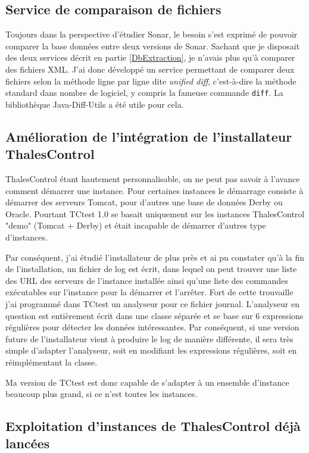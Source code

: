 \subsection{Service de comparaison de fichiers}

Toujours dans la perspective d'étudier Sonar, le besoin s'est exprimé de pouvoir 
comparer la base données entre deux versions de Sonar. Sachant que je disposait
des deux services décrit en partie \ref{DbExtraction}, je n'avais plus qu'à 
comparer des fichiers XML. J'ai donc développé un 
service permettant de comparer deux fichiers selon la méthode ligne par ligne 
dite \textit{unified diff}, c'est-à-dire la méthode standard dans nombre de 
logiciel, y compris la fameuse commande \verb|diff|. La bibliothèque 
Java-Diff-Utils a été utile pour cela.

\subsection{Amélioration de l'intégration de l'installateur ThalesControl}

ThalesControl étant hautement personnalisable, on ne peut pas savoir à l'avance 
comment démarrer une instance. Pour certaines instances le démarrage consiste 
à démarrer des serveurs Tomcat, pour d'autres une base de données Derby ou 
Oracle. Pourtant TCtest 1.0 se basait uniquement sur les instances ThalesControl
"demo" (Tomcat + Derby) et était incapable de démarrer d'autres type 
d'instances.

Par conséquent, j'ai étudié l'installateur de plus près et ai pu constater 
qu'à la fin de l'installation, un fichier de log est écrit, dans lequel on peut 
trouver une liste des URL des serveurs de l'instance installée ainsi qu'une 
liste des commandes exécutables sur l'instance pour la démarrer et l'arrêter.
Fort de cette trouvaille j'ai programmé dans TCtest un analyseur pour ce fichier
journal. L'analyseur en question est entièrement écrit dans une classe séparée 
et se base sur 6 expressions régulières pour détecter les données intéressantes.
Par conséquent, si une version future de l'installateur vient à produire le log
de manière différente, il sera très simple d'adapter l'analyseur, soit en 
modifiant les expressions régulières, soit en réimplémentant la classe. 

Ma version de TCtest est donc capable de s'adapter à un ensemble 
d'instance beaucoup plus grand, si ce n'est toutes les instances.

\subsection{Exploitation d'instances de ThalesControl déjà lancées}

